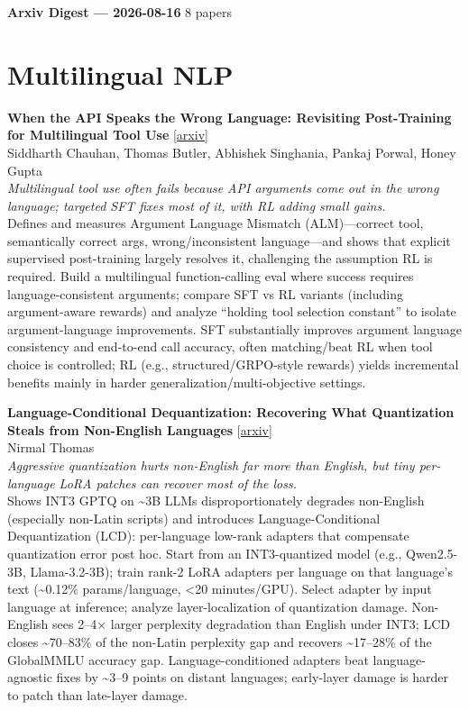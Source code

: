 \documentclass[12pt,letterpaper]{article}
\begin{document}
{\footnotesize\textbf{Arxiv Digest --- 2026-08-16} \hfill 8 papers}

\smallskip

\section*{Multilingual NLP}

{\small\textbf{When the API Speaks the Wrong Language: Revisiting Post-Training for Multilingual Tool Use}} {\scriptsize[\href{https://arxiv.org/abs/2608.11715}{arxiv}]}\\
{\scriptsize Siddharth Chauhan, Thomas Butler, Abhishek Singhania, Pankaj Porwal, Honey Gupta}\\

{\small\textit{Multilingual tool use often fails because API arguments come out in the wrong language; targeted SFT fixes most of it, with RL adding small gains.}}\\[1pt]
{\footnotesize Defines and measures Argument Language Mismatch (ALM)---correct tool, semantically correct args, wrong/inconsistent language---and shows that explicit supervised post-training largely resolves it, challenging the assumption RL is required. Build a multilingual function-calling eval where success requires language-consistent arguments; compare SFT vs RL variants (including argument-aware rewards) and analyze ``holding tool selection constant'' to isolate argument-language improvements. SFT substantially improves argument language consistency and end-to-end call accuracy, often matching/beat RL when tool choice is controlled; RL (e.g., structured/GRPO-style rewards) yields incremental benefits mainly in harder generalization/multi-objective settings.}

\medskip

{\small\textbf{Language-Conditional Dequantization: Recovering What Quantization Steals from Non-English Languages}} {\scriptsize[\href{https://arxiv.org/abs/2608.11786}{arxiv}]}\\
{\scriptsize Nirmal Thomas}\\

{\small\textit{Aggressive quantization hurts non-English far more than English, but tiny per-language LoRA patches can recover most of the loss.}}\\[1pt]
{\footnotesize Shows INT3 GPTQ on \textasciitilde{}3B LLMs disproportionately degrades non-English (especially non-Latin scripts) and introduces Language-Conditional Dequantization (LCD): per-language low-rank adapters that compensate quantization error post hoc. Start from an INT3-quantized model (e.g., Qwen2.5-3B, Llama-3.2-3B); train rank-2 LoRA adapters per language on that language's text (\textasciitilde{}0.12\% params/language, <20 minutes/GPU). Select adapter by input language at inference; analyze layer-localization of quantization damage. Non-English sees 2--4× larger perplexity degradation than English under INT3; LCD closes \textasciitilde{}70--83\% of the non-Latin perplexity gap and recovers \textasciitilde{}17--28\% of the GlobalMMLU accuracy gap. Language-conditioned adapters beat language-agnostic fixes by \textasciitilde{}3--9 points on distant languages; early-layer damage is harder to patch than late-layer damage.}
\end{document}
